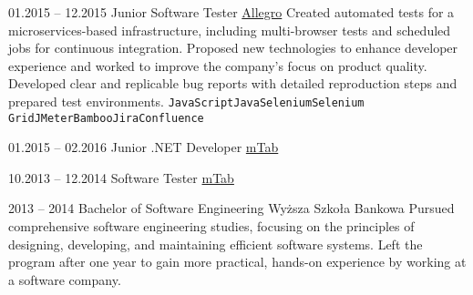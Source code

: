 \documentclass[9pt]{config}
\begin{document}
\begin{entrylist}
  \entry
  {01.2015 -- 12.2015}
  {Junior Software Tester}
  {\href{https://allegro.pl}{Allegro}}
  {Created automated tests for a microservices-based infrastructure,
    including multi-browser tests and scheduled jobs for continuous
    integration. Proposed new technologies to enhance developer
    experience and worked to improve the company's focus on product
    quality. Developed clear and replicable bug reports with detailed
  reproduction steps and prepared test environments.}
  {\texttt{JavaScript}\slashsep\texttt{Java}\slashsep\texttt{Selenium}\slashsep\texttt{Selenium
  Grid}\slashsep\texttt{JMeter}\slashsep\texttt{Bamboo}\slashsep\texttt{Jira}\slashsep\texttt{Confluence}}

  \entry
  {01.2015 -- 02.2016}
  {Junior .NET Developer}
  {\href{https://mtab.com}{mTab}}
  {}
  {}

  \entry
  {10.2013 -- 12.2014}
  {Software Tester}
  {\href{https://mtab.com}{mTab}}
  {}
  {}
\end{entrylist}



\begin{entrylist}
  \entry
  {2013 -- 2014}
  {Bachelor of Software Engineering}
  {Wyższa Szkoła Bankowa}
  {Pursued comprehensive software engineering studies, focusing on
    the principles of designing, developing, and maintaining efficient
    software systems. Left the program after one year to gain more
  practical, hands-on experience by working at a software company.}
  {}
\end{entrylist}

\end{document}
